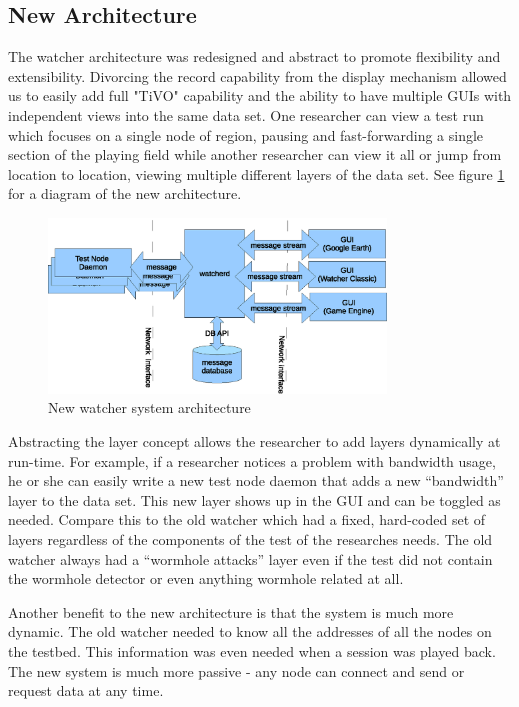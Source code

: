 \documentclass{report}
\begin{document}
\subsection{New Architecture}

The watcher architecture was redesigned and abstract to promote flexibility and extensibility. Divorcing the record 
capability from the display mechanism allowed us to easily add full "TiVO" capability and the ability to have multiple 
GUIs with independent views into the same data set. One researcher can view a test run which focuses on a single node of region, 
pausing and fast-forwarding a single section of the playing field while another researcher can view it all or jump from 
location to location, viewing multiple different layers of the data set. See figure \ref{fig:watcherArch} for a diagram 
of the new architecture.

\begin{figure}[htb]
\centering
\includegraphics[width=0.8\textwidth]{watcherArch.eps}
\caption{New watcher system architecture}
\label{fig:watcherArch}
\end{figure}

Abstracting the layer concept allows the researcher to add layers dynamically at run-time. For example, 
if a researcher notices a problem with bandwidth usage, he or she can easily write a new test node daemon that 
adds a new ``bandwidth'' layer to the data set. This new layer shows up in the GUI and can be toggled as needed. 
Compare this to the old watcher which had a fixed, hard-coded set of layers regardless of the components of the test
of the researches needs. The old watcher always had a ``wormhole attacks'' layer even if the test did not 
contain the wormhole detector or even anything wormhole related at all. 

Another benefit to the new architecture is that the system is much more dynamic. The old watcher needed to know all the addresses of all the nodes
on the testbed. This information was even needed when a session was played back. The new system is much more passive - any node can connect and 
send or request data at any time. 
\end{document}
